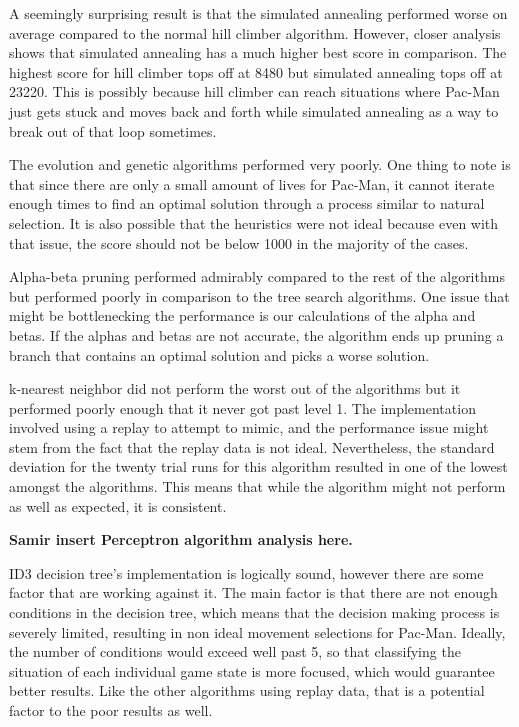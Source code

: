 \documentclass[a4paper,oneside,10pt]{report}
\begin{document}
A seemingly surprising result is that the simulated annealing performed worse on average compared to the normal hill climber algorithm. However, closer analysis shows that simulated annealing has a much higher best score in comparison. The highest score for hill climber tops off at 8480 but simulated annealing tops off at 23220. This is possibly because hill climber can reach situations where Pac-Man just gets stuck and moves back and forth while simulated annealing as a way to break out of that loop sometimes. 

The evolution and genetic algorithms performed very poorly. One thing to note is that since there are only a small amount of lives for Pac-Man, it cannot iterate enough times to find an optimal solution through a process similar to natural selection. It is also possible that the heuristics were not ideal because even with that issue, the score should not be below 1000 in the majority of the cases.

Alpha-beta pruning performed admirably compared to the rest of the algorithms but performed poorly in comparison to the tree search algorithms. One issue that might be bottlenecking the performance is our calculations of the alpha and betas. If the alphas and betas are not accurate, the algorithm ends up pruning a branch that contains an optimal solution and picks a worse solution.

k-nearest neighbor did not perform the worst out of the algorithms but it performed poorly enough that it never got past level 1. The implementation involved using a replay to attempt to mimic, and the performance issue might stem from the fact that the replay data is not ideal. Nevertheless, the standard deviation for the twenty trial runs for this algorithm resulted in one of the lowest amongst the algorithms. This means that while the algorithm might not perform as well as expected, it is consistent.


\textbf{Samir insert Perceptron algorithm analysis here.}

ID3 decision tree's implementation is logically sound, however there are some factor that are working against it. The main factor is that there are not enough conditions in the decision tree, which means that the decision making process is severely limited, resulting in non ideal movement selections for Pac-Man. Ideally, the number of conditions would exceed well past 5, so that classifying the situation of each individual game state is more focused, which would guarantee better results. Like the other algorithms using replay data, that is a potential factor to the poor results as well.
\end{document}
